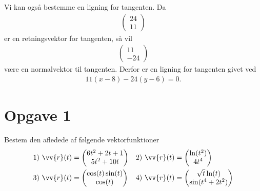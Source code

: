 \begin{exa}
	Vi kan også bestemme en ligning for tangenten. Da 
	\begin{align*}
		\begin{pmatrix}
			24 \\
			11
		\end{pmatrix}
	\end{align*}
	er en retningsvektor for tangenten, så vil
	\begin{align*}
		\begin{pmatrix}
			11 \\
			-24
		\end{pmatrix}
	\end{align*}
	være en normalvektor til tangenten. Derfor er en ligning for tangenten givet ved
	\begin{align*}
		11(x-8) -24(y-6) = 0.
	\end{align*}
\end{exa}

\section*{Opgave 1}
Bestem den afledede af følgende vektorfunktioner
\begin{align*}
	&1) \ \vv{r}(t) = 
	\begin{pmatrix}
		6t^2+2t+1\\
		5t^2+10t
	\end{pmatrix}	
	  &&2) \ \vv{r}(t) = 
	\begin{pmatrix}
		\ln(t^2)\\
		4t^4
	\end{pmatrix}	   \\
	&3) \ \vv{r}(t) = 
	\begin{pmatrix}
		\cos(t) \sin(t)\\
		\cos(t)
	\end{pmatrix}	  &&4) \  \vv{r}(t) = 
	\begin{pmatrix}
		\sqrt{t}\ln(t)\\
		\sin(t^4+2t^2)
	\end{pmatrix}	  \\
\end{align*}

